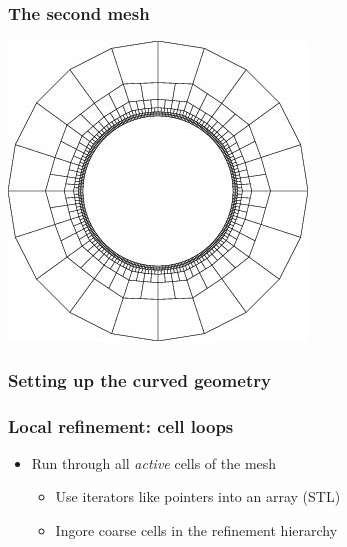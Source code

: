 \begin{frame}
  \frametitle{The second mesh}
  \begin{center}
    \includegraphics[height=.8\textheight]{graph/step1-2}
  \end{center}  
\end{frame}

\begin{frame}
  \frametitle{Setting up the curved geometry}
  \begin{block}{}
    
  \end{block}
\end{frame}

\begin{frame}
  \frametitle{Local refinement: cell loops}
  \begin{block}{}
        
  \end{block}

  \begin{itemize}
  \item Run through all \textit{active} cells of the mesh
    \begin{itemize}
    \item Use iterators like pointers into an array (STL)
    \item Ingore coarse cells in the refinement hierarchy
    \end{itemize}
  \end{itemize}
\end{frame}

